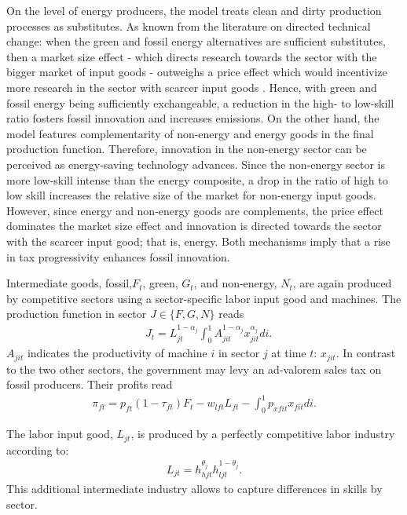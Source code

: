 On the level of energy producers, the model treats clean and dirty production processes as substitutes. As known from the literature on directed technical change: when the green and fossil energy alternatives are sufficient substitutes, then a market size effect - which directs research towards the sector with the bigger market of input goods - outweighs a price effect which would incentivize more research in the sector with scarcer input goods \citep{Hemous2021DirectedEconomics}. Hence, with green and fossil energy being sufficiently exchangeable, a reduction in the high- to low-skill ratio fosters fossil innovation and increases emissions. 
On the other hand, the model features complementarity of non-energy and energy goods in the final production function. Therefore, innovation in the non-energy sector can be perceived as energy-saving technology advances. Since the non-energy sector is more low-skill intense than the energy composite, a drop in the ratio of high to low skill increases the relative size of the market for non-energy input goods. However, since energy and non-energy goods are complements, the price effect dominates the market size effect and innovation is directed towards the sector with the scarcer input good; that is, energy. Both mechanisms imply that a rise in tax progressivity enhances fossil innovation. 

Intermediate goods, fossil,$F_t$, green, $G_t$, and non-energy, $N_t$, are again produced by competitive sectors using a sector-specific labor input good and machines. The production function in sector $J\in \{F,G,N\}$ reads
\begin{align}
&J_{t}= L_{jt}^{1-\alpha_j}\int_{0}^{1}A_{jit}^{1-\alpha_j}x_{jit}^{\alpha_j} di.
\end{align}
$A_{jit}$ indicates the productivity of machine $i$ in sector $j$ at time $t$: $x_{jit}$. In contrast to the two other sectors, the government may levy an ad-valorem sales tax on fossil producers. Their profits read
\begin{align}
\pi_{ft}=p_{ft}(1-\tau_{ft})F_t-w_{lft}L_{ft}-\int_{0}^{1}p_{xfit}x_{fit}di.
\end{align}

The labor input good, $L_{jt}$, is produced by a perfectly competitive labor industry according to: 
\begin{align}
L_{jt}=h_{hjt}^{\theta_j}h_{ljt}^{1-\theta_j}.
\end{align}
This additional intermediate industry allows to capture differences in skills by sector.

